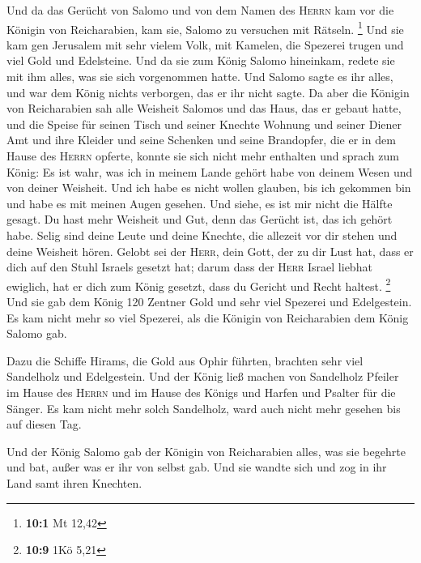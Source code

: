  Und da das Gerücht von Salomo und von dem Namen des
\textsc{Herrn} kam vor die Königin von Reicharabien, kam sie, Salomo zu
versuchen mit Rätseln. \footnote{\textbf{10:1} Mt 12,42} 
Und sie kam gen Jerusalem mit sehr vielem Volk, mit Kamelen, die
Spezerei trugen und viel Gold und Edelsteine. Und da sie zum König
Salomo hineinkam, redete sie mit ihm alles, was sie sich vorgenommen
hatte.  Und Salomo sagte es ihr alles, und war dem König
nichts verborgen, das er ihr nicht sagte.  Da aber die
Königin von Reicharabien sah alle Weisheit Salomos und das Haus, das er
gebaut hatte,  und die Speise für seinen Tisch und seiner
Knechte Wohnung und seiner Diener Amt und ihre Kleider und seine
Schenken und seine Brandopfer, die er in dem Hause des \textsc{Herrn}
opferte, konnte sie sich nicht mehr enthalten  und sprach
zum König: Es ist wahr, was ich in meinem Lande gehört habe von deinem
Wesen und von deiner Weisheit.  Und ich habe es nicht
wollen glauben, bis ich gekommen bin und habe es mit meinen Augen
gesehen. Und siehe, es ist mir nicht die Hälfte gesagt. Du hast mehr
Weisheit und Gut, denn das Gerücht ist, das ich gehört habe.
 Selig sind deine Leute und deine Knechte, die allezeit
vor dir stehen und deine Weisheit hören.  Gelobt sei der
\textsc{Herr}, dein Gott, der zu dir Lust hat, dass er dich auf den
Stuhl Israels gesetzt hat; darum dass der \textsc{Herr} Israel liebhat
ewiglich, hat er dich zum König gesetzt, dass du Gericht und Recht
haltest. \footnote{\textbf{10:9} 1Kö 5,21}  Und sie gab
dem König 120 Zentner Gold und sehr viel Spezerei und Edelgestein. Es
kam nicht mehr so viel Spezerei, als die Königin von Reicharabien dem
König Salomo gab.

 Dazu die Schiffe Hirams, die Gold aus Ophir führten,
brachten sehr viel Sandelholz und Edelgestein.  Und der
König ließ machen von Sandelholz Pfeiler im Hause des \textsc{Herrn} und
im Hause des Königs und Harfen und Psalter für die Sänger. Es kam nicht
mehr solch Sandelholz, ward auch nicht mehr gesehen bis auf diesen Tag.

 Und der König Salomo gab der Königin von Reicharabien
alles, was sie begehrte und bat, außer was er ihr von selbst gab. Und
sie wandte sich und zog in ihr Land samt ihren Knechten.

